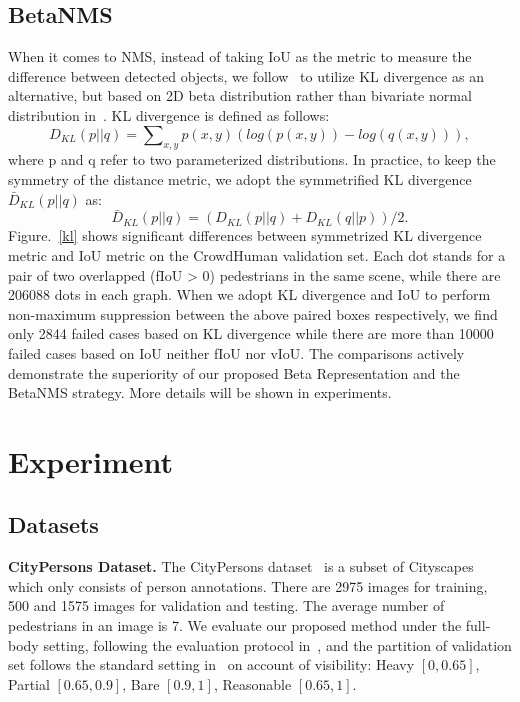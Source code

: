 \documentclass{article}
\begin{document}
\subsection{BetaNMS}
When it comes to NMS, instead of taking IoU as the metric to measure the difference between detected objects, we follow~\cite{Distribution} to utilize KL divergence as an alternative, but based on 2D beta distribution rather than bivariate normal distribution in~\cite{Distribution}.
KL divergence is defined as follows:
\begin{equation}
    D_{KL}(p||q) = \sum\nolimits_{x, y} p(x, y) (log(p(x, y)) - log(q(x, y))),
\end{equation}
where p and q refer to two parameterized distributions. In practice, to keep the symmetry of the distance metric, we adopt the symmetrified KL divergence $\bar{D}_{KL}(p||q)$ as:
\begin{equation}
    \bar{D}_{KL}(p||q) = (D_{KL}(p||q) + D_{KL}(q||p)) / 2.
\end{equation}
Figure.~\ref{kl} shows significant differences between symmetrized KL divergence metric and IoU metric on the CrowdHuman validation set.
Each dot stands for a pair of two overlapped (fIoU >  0) pedestrians in the same scene, while there are 206088 dots in each graph.
When we adopt KL divergence and IoU to perform non-maximum suppression between the above paired boxes respectively, we find only 2844 failed cases based on KL divergence while there are more than 10000 failed cases based on IoU neither fIoU nor vIoU. 
The comparisons actively demonstrate the superiority of our proposed Beta Representation and the BetaNMS strategy. More details will be shown in experiments.


\section{Experiment}

\subsection{Datasets}
\textbf{CityPersons Dataset.}
The CityPersons dataset~\cite{citypersons} is a subset of Cityscapes which only consists of person annotations.
There are 2975 images for training, 500 and 1575 images for validation and testing. 
The average number of pedestrians in an image is 7. 
We evaluate our proposed method under the full-body setting, following the evaluation protocol in~\cite{citypersons}, and the partition of validation set follows the standard setting in~\cite{RepLoss} on account of visibility: Heavy $[0, 0.65]$, Partial $[0.65, 0.9]$, Bare $[0.9, 1]$, Reasonable $[0.65, 1]$. 
\end{document}
